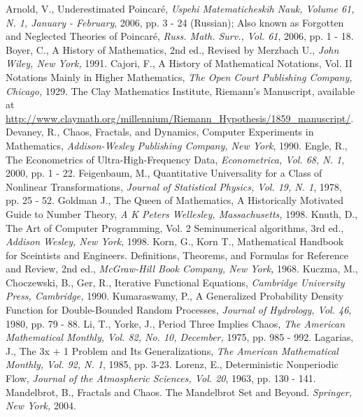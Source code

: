 \documentclass{article}
\begin{document}
\begin{thebibliography}{9}
 Arnold, V., Underestimated Poincar\'{e}, \textit{Uspehi Matematicheskih Nauk, Volume 61, N. 1, January - February}, 2006, pp. 3 - 24 (Russian); Also known as Forgotten and Neglected Theories of Poincar\'{e}, \textit{Russ. Math. Surv., Vol. 61}, 2006, pp. 1 - 18.
 Boyer, C., A History of Mathematics, 2nd ed., Revised by Merzbach U., \textit{John Wiley, New York,} 1991.
 Cajori, F.,  A History of Mathematical Notations, Vol. II Notations Mainly in Higher Mathematics, \textit{The Open Court Publishing Company, Chicago,} 1929.
 The Clay Mathematics Institute, Riemann's Manuscript, available at \url{http://www.claymath.org/millennium/Riemann_Hypothesis/1859_manuscript/}.
 Devaney, R., Chaos, Fractals, and Dynamics, Computer Experiments in Mathematics, \textit{Addison-Wesley Publishing Company, New York}, 1990.
 Engle, R., The Econometrics of Ultra-High-Frequency Data, \textit{Econometrica, Vol. 68, N. 1}, 2000, pp. 1 - 22.
 Feigenbaum, M., Quantitative Universality for a Class of Nonlinear Transformations, \textit{Journal of Statistical Physics, Vol. 19, N. 1}, 1978, pp. 25 - 52.
 Goldman J., The Queen of Mathematics, A Historically Motivated Guide to Number Theory, \textit{A K Peters Wellesley, Massachusetts,} 1998.
 Knuth, D., The Art of Computer Programming, Vol. 2 Seminumerical algorithms, 3rd ed., \textit{Addison Wesley, New York}, 1998.
 Korn, G., Korn T., Mathematical Handbook for Sceintists and Engineers. Definitions, Theorems, and Formulas for Reference and Review, 2nd ed., \textit{McGraw-Hill Book Company, New York,} 1968.
 Kuczma, M., Choczewski, B., Ger, R., Iterative Functional Equations, \textit{Cambridge University Press, Cambridge,} 1990.
 Kumaraswamy, P., A Generalized Probability Density Function for Double-Bounded Random Processes, \textit{Journal of Hydrology, Vol. 46}, 1980, pp. 79 - 88.
 Li, T., Yorke, J., Period Three Implies Chaos, \textit{The American Mathematical Monthly, Vol. 82, No. 10, December,} 1975, pp. 985 - 992.
 Lagarias, J., The 3x + 1 Problem and Its Generalizations, \textit{The American Mathematical Monthly, Vol. 92, N. 1}, 1985, pp. 3-23.
 Lorenz, E., Deterministic Nonperiodic Flow, \textit{Journal of the Atmospheric Sciences, Vol. 20}, 1963, pp. 130 - 141.
 Mandelbrot, B., Fractals and Chaos. The Mandelbrot Set and Beyond. \textit{Springer, New York,} 2004.

\end{thebibliography}
\end{document}
